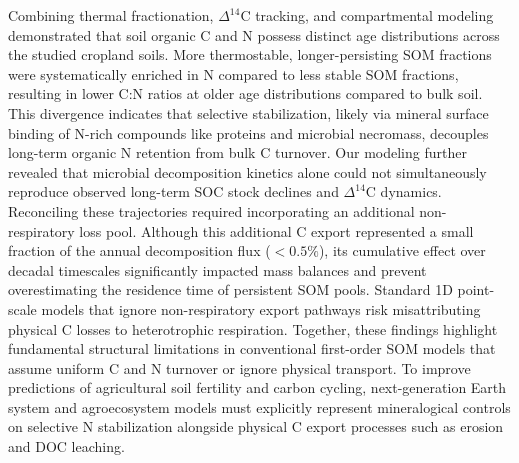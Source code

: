\documentclass[bg, manuscript]{copernicus}
\begin{document}
\conclusions %
Combining thermal fractionation, $\Delta^{14}\text{C}$ tracking, and compartmental modeling demonstrated that soil organic C and N possess distinct age distributions across the studied cropland soils. More thermostable, longer-persisting SOM fractions were systematically enriched in N compared to less stable SOM fractions, resulting in lower C:N ratios at older age distributions compared to bulk soil. This divergence indicates that selective stabilization, likely via mineral surface binding of N-rich compounds like proteins and microbial necromass, decouples long-term organic N retention from bulk C turnover. Our modeling further revealed that microbial decomposition kinetics alone could not simultaneously reproduce observed long-term SOC stock declines and $\Delta^{14}\text{C}$ dynamics. Reconciling these trajectories required incorporating an additional non-respiratory loss pool. Although this additional C export represented a small fraction of the annual decomposition flux ($< 0.5\%$), its cumulative effect over decadal timescales significantly impacted mass balances and prevent overestimating the residence time of persistent SOM pools. Standard 1D point-scale models that ignore non-respiratory export pathways risk misattributing physical C losses to heterotrophic respiration. Together, these findings highlight fundamental structural limitations in conventional first-order SOM models that assume uniform C and N turnover or ignore physical transport. To improve predictions of agricultural soil fertility and carbon cycling, next-generation Earth system and agroecosystem models must explicitly represent mineralogical controls on selective N stabilization alongside physical C export processes such as erosion and DOC leaching.



\end{document}
